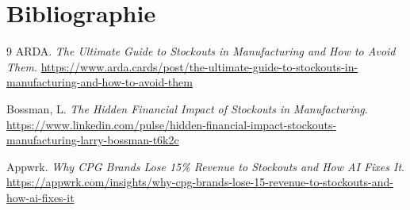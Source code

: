 \documentclass[12pt,a4paper]{report}
\begin{document}
\cleardoublepage

\chapter{Bibliographie}
\begin{thebibliography}{9}
   ARDA. \textit{The Ultimate Guide to Stockouts in Manufacturing and How to Avoid Them}.\newline
  \url{https://www.arda.cards/post/the-ultimate-guide-to-stockouts-in-manufacturing-and-how-to-avoid-them}

   Bossman, L. \textit{The Hidden Financial Impact of Stockouts in Manufacturing}.\newline
  \url{https://www.linkedin.com/pulse/hidden-financial-impact-stockouts-manufacturing-larry-bossman-t6k2c}

   Appwrk. \textit{Why CPG Brands Lose 15\% Revenue to Stockouts and How AI Fixes It}.\newline
  \url{https://appwrk.com/insights/why-cpg-brands-lose-15-revenue-to-stockouts-and-how-ai-fixes-it}
\end{thebibliography}
\end{document}
